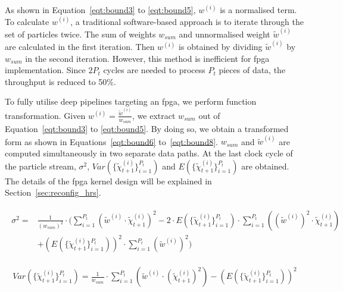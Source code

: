 As shown in Equation~\ref{eqt:bound3} to \ref{eqt:bound5}, ${w}^{(i)}$ is a normalised term. 
To calculate $w^{(i)}$, a traditional software-based approach is to iterate through the set of particles twice.
The sum of weights $w_{sum}$ and unnormalised weight $\widetilde{w}^{(i)}$ are calculated in the first iteration.
Then $w^{(i)}$ is obtained by dividing $\widetilde{w}^{(i)}$ by $w_{sum}$ in the second iteration.
However, this method is inefficient for \gls{fpga} implementation.
Since $2P_t$ cycles are needed to process $P_t$ pieces of data, the throughput is reduced to 50\%.

To fully utilise deep pipelines targeting an \gls{fpga}, we perform function transformation.
Given ${w}^{(i)} = \frac{\widetilde{w}^{(i)}}{w_{sum}}$, we extract $w_{sum}$ out of Equation~\ref{eqt:bound3} to \ref{eqt:bound5}.
By doing so, we obtain a transformed form as shown in Equations~\ref{eqt:bound6} to~\ref{eqt:bound8}.
$w_{sum}$ and $\widetilde{w}^{(i)}$ are computed simultaneously in two separate data paths.
At the last clock cycle of the particle stream, $\sigma^2$, $Var(\{\widetilde{\chi}_{t+1}^{(i)}\}^{P_t}_{i=1})$ and $E(\{\widetilde{\chi}_{t+1}^{(i)}\}^{P_t}_{i=1})$ are obtained.
The details of the \gls{fpga} kernel design will be explained in Section~\ref{sec:reconfig_hrs}.

\begin{eqnarray}
\begin{aligned}
\sigma^2 = & \frac{1}{(w_{sum})^2} \cdot ( \sum_{i=1}^{P_{t}}\left(\widetilde{w}^{(i)} \cdot \widetilde{\chi}_{t+1}^{(i)} \right)^2 - 2 \cdot E(\{\widetilde{\chi}_{t+1}^{(i)}\}^{P_t}_{i=1}) \cdot \sum_{i=1}^{P_{t}} \left ( (\widetilde{w}^{(i)})^2 \cdot \widetilde{\chi}_{t+1}^{(i)} \right )\\
& + \left(E(\{\widetilde{\chi}_{t+1}^{(i)}\}^{P_t}_{i=1})\right)^2 \cdot \sum_{i=1}^{P_{t}}(\widetilde{w}^{(i)})^2 )
\end{aligned}
\label{eqt:bound6}
\end{eqnarray}

\begin{equation}
\begin{aligned}
Var(\{\widetilde{\chi}_{t+1}^{(i)}\}^{P_t}_{i=1}) = \frac{1}{w_{sum}} \cdot \sum_{i=1}^{P_{t}} \left ( \widetilde{w}^{(i)} \cdot (\widetilde{\chi}_{t+1}^{(i)})^2 \right ) - \left( E(\{\widetilde{\chi}_{t+1}^{(i)}\}^{P_t}_{i=1}) \right)^2
\end{aligned}
\label{eqt:bound7}
\end{equation}

